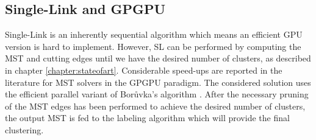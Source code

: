\subsection{Single-Link and GPGPU}
\label{sec:sl gpu}
Single-Link is an inherently sequential algorithm which means an efficient GPU version is hard to implement.
However, SL can be performed by computing the MST and cutting edges until we have the desired number of clusters, as described in chapter \ref{chapter:stateofart}.
Considerable speed-ups are reported in the literature for MST solvers in the GPGPU paradigm.
The considered solution uses the efficient parallel variant of Borůvka's algorithm \cite{Sousa2015}.
After the necessary pruning of the MST edges has been performed to achieve the desired number of clusters, the output MST is fed to the labeling algorithm which will provide the final clustering.

